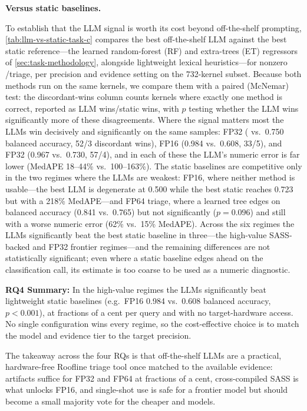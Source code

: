 \textbf{Versus static baselines.}

To establish that the LLM signal is worth its cost beyond off-the-shelf prompting, \autoref{tab:llm-vs-static-task-c} compares the best off-the-shelf LLM against the best static reference---the learned random-forest (RF) and extra-trees (ET) regressors of \autoref{sec:task-methodology}, alongside lightweight lexical heuristics---for nonzero \bandwidthbound/\computebound triage, per precision and evidence setting on the 732-kernel subset.
Because both methods run on the same kernels, we compare them with a paired (McNemar) test: the discordant-wins column counts kernels where exactly one method is correct, reported as LLM wins/static wins, with $p$ testing whether the LLM wins significantly more of these disagreements.
Where the signal matters most the LLMs win decisively and significantly on the same samples: \sourceonly FP32 ( vs.\ 0.750 balanced accuracy, 52/3 discordant wins), \sourcesass FP16 (0.984 vs.\ 0.608, 33/5), and \sourcesass FP32 (0.967 vs.\ 0.730, 57/4), and in each of these the LLM's numeric \rai error is far lower (MedAPE 18--44\% vs.\ 100--163\%).
The static baselines are competitive only in the two regimes where the LLMs are weakest: \sourceonly FP16, where neither method is usable---the best LLM is degenerate at 0.500 while the best static reaches 0.723 but with a 218\% MedAPE---and \sourcesass FP64 triage, where a learned tree edges \opus on balanced accuracy (0.841 vs.\ 0.765) but not significantly ($p=0.096$) and still with a worse numeric error (62\% vs.\ 15\% MedAPE).
Across the six regimes the LLMs significantly beat the best static baseline in three---the high-value SASS-backed and FP32 frontier regimes---and the remaining differences are not statistically significant; even where a static baseline edges ahead on the classification call, its \rai estimate is too coarse to be used as a numeric diagnostic.

\begin{rqsummary}
\textbf{RQ4 Summary:} In the high-value regimes the LLMs significantly beat lightweight static baselines (e.g.\ \sourcesass FP16 0.984 vs.\ 0.608 balanced accuracy, $p<0.001$), at fractions of a cent per query and with no target-hardware access. No single configuration wins every regime, so the cost-effective choice is to match the model and evidence tier to the target precision.
\end{rqsummary}

The takeaway across the four RQs is that off-the-shelf LLMs are a practical, hardware-free Roofline triage tool once matched to the available evidence: \sourceonly artifacts suffice for FP32 and FP64 at fractions of a cent, cross-compiled SASS is what unlocks FP16, and single-shot use is safe for a frontier \opus model but should become a small majority vote for the cheaper \gptfivefour and \gptoss models.
